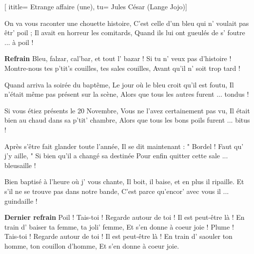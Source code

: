  [
ititle= {Etrange affaire (une)},
tu= {Jules César (Lange Jojo)}]


\beginverse
On va vous raconter une chouette histoire,
C'est celle d'un bleu qui n' voulait pas êtr' poil ;
Il avait en horreur les comitards,
Quand ils lui ont gueulés de s' foutre ... à poil !
\endverse

\beginchorus
\textbf {Refrain}
Bleu, falzar, cal'bar, et tout l' bazar !
Si tu n' veux pas d'histoire !
Montre-nous tes p'tit's couilles, tes sales couilles,
Avant qu'il n' soit trop tard !
\endchorus

\beginverse
Quand arriva la soirée du baptême,
Le jour où le bleu croit qu'il est foutu,
Il n'était même pas présent sur la scène,
Alors que tous les autres furent ... tondus !
\endverse

\beginverse
Si vous étiez présents le 20 Novembre,
Vous ne l'avez certainement pas vu,
Il était bien au chaud dans sa p'tit' chambre,
Alors que tous les bons poils furent ... bitus !
\endverse

\beginverse

Après s'être fait glander toute l'année,
Il se dit maintenant : " Bordel ! Faut qu' j'y aille, "
Si bien qu'il a changé sa destinée
Pour enfin quitter cette sale ... bleusaille !
\endverse

\beginverse

Bien baptisé à l'heure où j' vous chante,
Il boit, il baise, et en plus il ripaille.
Et s'il ne se trouve pas dans notre bande,
C'est parce qu'encor' avec vous il ... guindaille !
\endverse

\beginchorus
\textbf {Dernier refrain}
Poil ! Tais-toi ! Regarde autour de toi !
Il est peut-être là !
En train d' baiser ta femme, ta joli' femme,
Et s'en donne à coeur joie !
Plume ! Tais-toi ! Regarde autour de toi !
Il est peut-être là !
En train d' saouler ton homme, ton couillon d'homme,
Et s'en donne à coeur joie.
\endchorus
\endsong